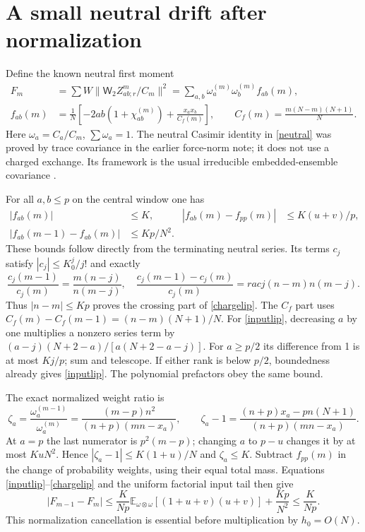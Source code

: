\documentclass[11pt,a4paper]{article}
\newcommand{\EE}{\mathbb E}
\newcommand{\W}{\mathsf W_2}
\begin{document}
\newpage
\section{A small neutral drift after normalization}
Define the known neutral first moment
\begin{align}
 F_m&=\sum W\|\W Z^m_{ab;r}/C_m\|^2
       =\sum_{a,b}\omega_a^{(m)}\omega_b^{(m)}f_{ab}(m),\\
 f_{ab}(m)&=\frac1N\left[-2ab(1+\chi^{(m)}_{ab})+
                       \frac{x_ax_b}{C_f(m)}\right],\qquad
 C_f(m)=\frac{m(N-m)(N+1)}N.\label{neutral}
\end{align}
Here $\omega_a=C_a/C_m$, $\sum\omega_a=1$. The neutral
Casimir identity in \eqref{neutral} was proved by trace covariance
in the earlier force-norm note; it does not use a charged exchange.
Its framework is the usual irreducible embedded-ensemble covariance
\cite{TT,local}.

For all $a,b\le p$ on the central window one has
\begin{align}
 |f_{ab}(m)|&\le K,&
 |f_{ab}(m)-f_{pp}(m)|&\le K(u+v)/p,\label{inputlip}\\
 |f_{ab}(m-1)-f_{ab}(m)|&\le Kp/N^2.\label{chargelip}
\end{align}
These bounds follow directly from the terminating neutral series.
Its terms $c_j$ satisfy $|c_j|\le K_0^j/j!$ and exactly
\begin{equation}
 \frac{c_j(m-1)}{c_j(m)}=\frac{m(n-j)}{n(m-j)},\quad
 \frac{c_j(m-1)-c_j(m)}{c_j(m)}=rac{j(n-m)}{n(m-j)}.
\end{equation}
Thus $|n-m|\le Kp$ proves the crossing part of \eqref{chargelip}.
The $C_f$ part uses $C_f(m)-C_f(m-1)=(n-m)(N+1)/N$.
For \eqref{inputlip}, decreasing $a$ by one multiplies a nonzero
series term by $(a-j)(N+2-a)/[a(N+2-a-j)]$.
For $a\ge p/2$ its difference from 1 is at most $Kj/p$;
sum and telescope. If either rank is below $p/2$, boundedness
already gives \eqref{inputlip}. The polynomial prefactors obey
the same bound.

The exact normalized weight ratio is
\begin{equation}
 \zeta_a=\frac{\omega_a^{(m-1)}}{\omega_a^{(m)}}
 =\frac{(m-p)n^2}{(n+p)(mn-x_a)},\qquad
 \zeta_a-1=\frac{(n+p)x_a-pn(N+1)}{(n+p)(mn-x_a)}.
\end{equation}
At $a=p$ the last numerator is $p^2(m-p)$; changing $a$ to
$p-u$ changes it by at most $KuN^2$. Hence
$|\zeta_a-1|\le K(1+u)/N$ and $\zeta_a\le K$.
Subtract $f_{pp}(m)$ in the change of probability weights, using
their equal total mass. Equations \eqref{inputlip}--\eqref{chargelip}
and the uniform factorial input tail then give
\begin{equation}
 |F_{m-1}-F_m|\le \frac{K}{Np}
 \EE_{\omega\otimes\omega}[(1+u+v)(u+v)]+\frac{Kp}{N^2}
 \le\frac K{Np}.\label{drift}
\end{equation}
This normalization cancellation is essential before multiplication
by $h_0=O(N)$.
\end{document}
